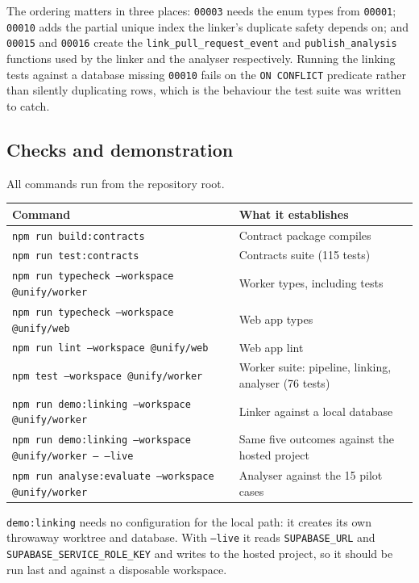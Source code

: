 \noindent The ordering matters in three places: \texttt{00003} needs the enum
types from \texttt{00001}; \texttt{00010} adds the partial unique index the
linker's duplicate safety depends on; and \texttt{00015} and \texttt{00016}
create the \texttt{link\_pull\_request\_event} and \texttt{publish\_analysis}
functions used by the linker and the analyser respectively. Running the
linking tests against a database missing \texttt{00010} fails on the
\texttt{ON CONFLICT} predicate rather than silently duplicating rows, which is
the behaviour the test suite was written to catch.

\subsection{Checks and demonstration}

All commands run from the repository root.

\begin{longtable}{>{\raggedright\arraybackslash}p{}>{\raggedright\arraybackslash}p{}}
\toprule
\textbf{Command} & \textbf{What it establishes} \\
\midrule
\endhead
\texttt{npm run build:contracts} & Contract package compiles \\
\texttt{npm run test:contracts} & Contracts suite (115 tests) \\
\texttt{npm run typecheck --workspace @unify/worker} & Worker types, including
  tests \\
\texttt{npm run typecheck --workspace @unify/web} & Web app types \\
\texttt{npm run lint --workspace @unify/web} & Web app lint \\
\texttt{npm test --workspace @unify/worker} & Worker suite: pipeline, linking,
  analyser (76 tests) \\
\texttt{npm run demo:linking --workspace @unify/worker} & Linker against a
  local database \\
\texttt{npm run demo:linking --workspace @unify/worker -- --live} & Same five
  outcomes against the hosted project \\
\texttt{npm run analyse:evaluate --workspace @unify/worker} & Analyser against
  the 15 pilot cases \\
\bottomrule
\end{longtable}

\noindent \texttt{demo:linking} needs no configuration for the local path: it
creates its own throwaway worktree and database. With \texttt{--live} it reads
\texttt{SUPABASE\_URL} and \texttt{SUPABASE\_SERVICE\_ROLE\_KEY} and writes to
the hosted project, so it should be run last and against a disposable
workspace.

